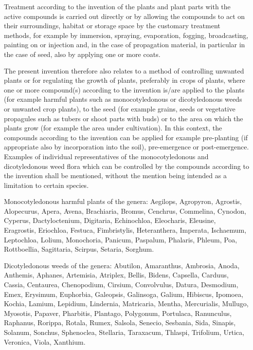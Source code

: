 \documentclass[11pt,a4paper]{article}
\begin{document}
Treatment according to the invention of the plants and plant parts with the active compounds is carried out directly or by allowing the compounds to act on their surroundings, habitat or storage space by the customary treatment methods, for example by immersion, spraying, evaporation, fogging, broadcasting, painting on or injection and, in the case of propagation material, in particular in the case of seed, also by applying one or more coats.

The present invention therefore also relates to a method of controlling unwanted plants or for regulating the growth of plants, preferably in crops of plants, where one or more compound(s) according to the invention is/are applied to the plants (for example harmful plants such as monocotyledonous or dicotyledonous weeds or unwanted crop plants), to the seed (for example grains, seeds or vegetative propagules such as tubers or shoot parts with buds) or to the area on which the plants grow (for example the area under cultivation). In this context, the compounds according to the invention can be applied for example pre-planting (if appropriate also by incorporation into the soil), pre-emergence or post-emergence. Examples of individual representatives of the monocotyledonous and dicotyledonous weed flora which can be controlled by the compounds according to the invention shall be mentioned, without the mention being intended as a limitation to certain species.

Monocotyledonous harmful plants of the genera: Aegilops, Agropyron, Agrostis, Alopecurus, Apera, Avena, Brachiaria, Bromus, Cenchrus, Commelina, Cynodon, Cyperus, Dactyloctenium, Digitaria, Echinochloa, Eleocharis, Eleusine, Eragrostis, Eriochloa, Festuca, Fimbristylis, Heteranthera, Imperata, Ischaemum, Leptochloa, Lolium, Monochoria, Panicum, Paspalum, Phalaris, Phleum, Poa, Rottboellia, Sagittaria, Scirpus, Setaria, Sorghum.

Dicotyledonous weeds of the genera: Abutilon, Amaranthus, Ambrosia, Anoda, Anthemis, Aphanes, Artemisia, Atriplex, Bellis, Bidens, Capsella, Carduus, Cassia, Centaurea, Chenopodium, Cirsium, Convolvulus, Datura, Desmodium, Emex, Erysimum, Euphorbia, Galeopsis, Galinsoga, Galium, Hibiscus, Ipomoea, Kochia, Lamium, Lepidium, Lindernia, Matricaria, Mentha, Mercurialis, Mullugo, Myosotis, Papaver, Pharbitis, Plantago, Polygonum, Portulaca, Ranunculus, Raphanus, Rorippa, Rotala, Rumex, Salsola, Senecio, Sesbania, Sida, Sinapis, Solanum, Sonchus, Sphenoclea, Stellaria, Taraxacum, Thlaspi, Trifolium, Urtica, Veronica, Viola, Xanthium.
\end{document}
